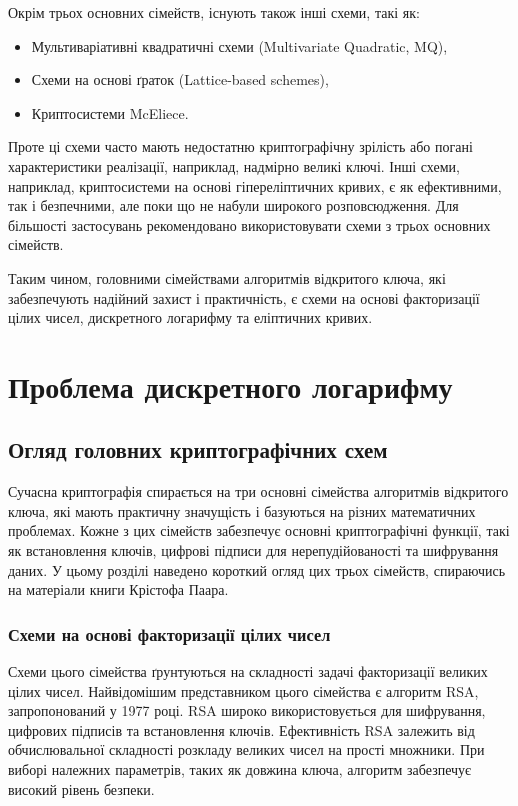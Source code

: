 \documentclass[12pt]{report}
\begin{document}
Окрім трьох основних сімейств, існують також інші схеми, такі як:
\begin{itemize}
    \item Мультиваріативні квадратичні схеми (Multivariate Quadratic, MQ),
    \item Схеми на основі ґраток (Lattice-based schemes),
    \item Криптосистеми McEliece.
\end{itemize}

Проте ці схеми часто мають недостатню криптографічну зрілість або погані характеристики реалізації, наприклад, надмірно великі ключі. Інші схеми, наприклад, криптосистеми на основі гіпереліптичних кривих, є як ефективними, так і безпечними, але поки що не набули широкого розповсюдження. Для більшості застосувань рекомендовано використовувати схеми з трьох основних сімейств.

Таким чином, головними сімействами алгоритмів відкритого ключа, які забезпечують надійний захист і практичність, є схеми на основі факторизації цілих чисел, дискретного логарифму та еліптичних кривих.

\chapter{Проблема дискретного логарифму}

\section{Огляд головних криптографічних схем}

Сучасна криптографія спирається на три основні сімейства алгоритмів відкритого ключа, які мають практичну значущість і базуються на різних математичних проблемах. Кожне з цих сімейств забезпечує основні криптографічні функції, такі як встановлення ключів, цифрові підписи для нерепудійованості та шифрування даних. У цьому розділі наведено короткий огляд цих трьох сімейств, спираючись на матеріали книги Крістофа Паара.

\subsection{Схеми на основі факторизації цілих чисел}

Схеми цього сімейства ґрунтуються на складності задачі факторизації великих цілих чисел. Найвідомішим представником цього сімейства є алгоритм RSA, запропонований у 1977 році. RSA широко використовується для шифрування, цифрових підписів та встановлення ключів. Ефективність RSA залежить від обчислювальної складності розкладу великих чисел на прості множники. При виборі належних параметрів, таких як довжина ключа, алгоритм забезпечує високий рівень безпеки.
\end{document}
